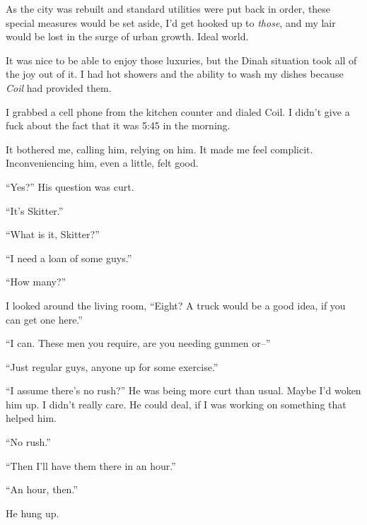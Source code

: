 As the city was rebuilt and standard utilities were put back in order, these special measures would be set aside, I'd get hooked up to \emph{those}, and my lair would be lost in the surge of urban growth.  Ideal world.



It was nice to be able to enjoy those luxuries, but the Dinah situation took all of the joy out of it.  I had hot showers and the ability to wash my dishes because \emph{Coil} had provided them.



I grabbed a cell phone from the kitchen counter and dialed Coil.  I didn't give a fuck about the fact that it was 5:45 in the morning.



It bothered me, calling him, relying on him.  It made me feel complicit.  Inconveniencing him, even a little, felt good.



``Yes?''  His question was curt.



``It's Skitter.''



``What is it, Skitter?''



``I need a loan of some guys.''



``How many?''



I looked around the living room, ``Eight?  A truck would be a good idea, if you can get one here.''



``I can.  These men you require, are you needing gunmen or--''



``Just regular guys, anyone up for some exercise.''



``I assume there's no rush?''  He was being more curt than usual.  Maybe I'd woken him up.  I didn't really care.  He could deal, if I was working on something that helped him.



``No rush.''



``Then I'll have them there in an hour.''



``An hour, then.''



He hung up.




